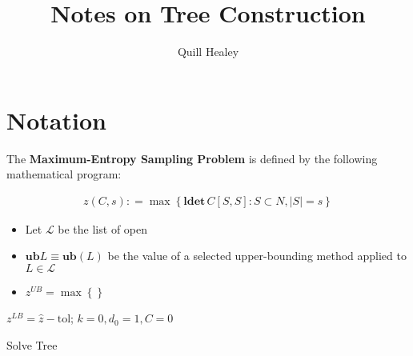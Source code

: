 \documentclass[12pt, reqno]{article}
\title{Notes on Tree Construction}
\author{Quill Healey}
\newcommand{\definedas}{\mathrel{\mathop:}=}
\begin{document}
\maketitle

\section*{Notation}
\noindent The \textbf{Maximum-Entropy Sampling Problem} is defined by the following mathematical program:

\begin{align*}
    z(C, s) \definedas \max \left\{ \textbf{ldet}\, C[S, S] : S \subset N, \left| S \right| = s\right\} 
\end{align*}

\begin{itemize}
    \item Let $\mathcal{L}$ be the list of open
    \item $\textbf{ub} L \equiv \textbf{ub}(L)$ be the value of a selected upper-bounding method applied to $L \in \mathcal{L}$
    \item $z^{UB} = \max \left\{  \right\}$
\end{itemize}

\begin{algorithm}[H]
    \SetAlgoLined
        $z^{LB} = \hat{z} - \text{tol}$;
        $k=0, d_0 = 1, C = 0$\;
        \caption{Solve Tree}
\end{algorithm}    
\end{document}
